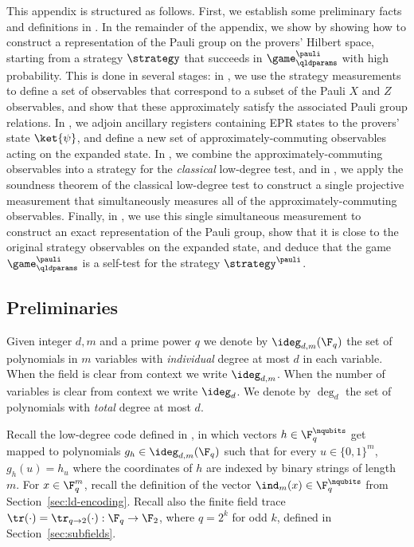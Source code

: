 This appendix is structured as follows. First, we establish some preliminary facts and definitions 
in . In the remainder of the appendix, we
show  by showing how to construct a representation of
the Pauli group on the provers' Hilbert space, starting from a
strategy $\strategy$ that succeeds in $\game^\pauli_\qldparams$ with
high probability. This is done in several stages: in
, we use the strategy measurements to define a
set of observables that correspond to a subset of the Pauli $X$ and
$Z$ observables, and show that these
approximately satisfy the associated Pauli group relations. In ,
we adjoin ancillary registers containing EPR states to the provers'
state $\ket{\psi}$, and define a new set of approximately-commuting
observables acting on the expanded state. In , we
combine the approximately-commuting observables into a strategy for
the \emph{classical} low-degree test, and in , we
apply the soundness theorem of the classical low-degree test to
construct a single projective measurement that simultaneously measures all of the
approximately-commuting observables. Finally, in
, we use this single simultaneous measurement to
construct an exact representation of the Pauli group, show that it
is close to the original strategy observables on the expanded state, and deduce that the game $\game^\pauli_\qldparams$ is a self-test for the strategy $\strategy^\pauli$.

\subsection{Preliminaries}
\label{sec:qld-prelim}


\begin{definition}
Given integer $d,m$ and a prime power $q$ we denote by $\ideg_{d,m}(\F_q)$ the set of polynomials in $m$ variables
  with \emph{individual} degree at most $d$ in each variable. When the field is clear from context we write $\ideg_{d,m}$. 	
	When
  the number of variables is clear from context we
  write $\ideg_d$. We denote by $\deg_{d}$ the set of polynomials with
  \emph{total} degree at most $d$.
\end{definition}

Recall the low-degree code defined in , in which vectors $h \in \F_q^\nqubits$ get mapped to polynomials $g_h \in \ideg_{d,m}(\F_q)$ such that for every $u \in \{0,1\}^m$, $g_h(u) = h_u$ where the coordinates of $h$ are indexed by binary strings of length $m$. For $x\in \F_q^m$, recall the definition of the vector $\ind_m(x) \in \F_q^\nqubits$ from Section~\ref{sec:ld-encoding}. Recall also the finite field trace $\tr(\cdot)=\tr_{q\to 2}(\cdot):\F_q\to\F_2$, where $q=2^k$ for odd $k$, defined in Section~\ref{sec:subfields}. 




